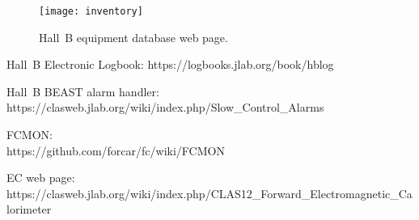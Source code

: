 \documentclass[letterpaper,10pt]{article}
\begin{document}
\begin{figure}[htbp]
  \centering
  \texttt{[image: inventory]}
  \vspace{2mm}
\caption{Hall~B equipment database web page.}
\label{inventory}
\end{figure}

\clearpage

\vfil
\eject

\begin{thebibliography}{99}

  Hall~B Electronic Logbook: https://logbooks.jlab.org/book/hblog

  Hall~B BEAST alarm handler: \\
  https://clasweb.jlab.org/wiki/index.php/Slow\_Control\_Alarms

  FCMON:\\
  https://github.com/forcar/fc/wiki/FCMON  

  EC web page: \\
  https://clasweb.jlab.org/wiki/index.php/CLAS12\_Forward\_Electromagnetic\_Calorimeter
  
\end{thebibliography}
\end{document}
